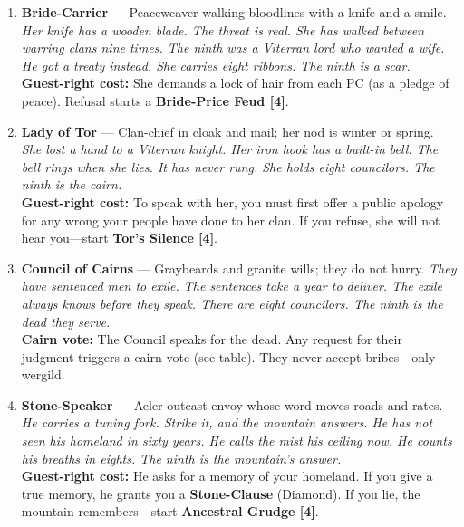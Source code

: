 \begin{enumerate}
\item[J] \textbf{Bride-Carrier} --- Peaceweaver walking bloodlines with a knife and a smile.
  \hfill \textit{Her knife has a wooden blade. The threat is real. She has walked between warring clans nine times. The ninth was a Viterran lord who wanted a wife. He got a treaty instead. She carries eight ribbons. The ninth is a scar.} \\
  \textbf{Guest-right cost:} She demands a lock of hair from each PC (as a pledge of peace). Refusal starts a \textbf{Bride-Price Feud [4]}.

\item[Q] \textbf{Lady of Tor} --- Clan-chief in cloak and mail; her nod is winter or spring.
  \hfill \textit{She lost a hand to a Viterran knight. Her iron hook has a built-in bell. The bell rings when she lies. It has never rung. She holds eight councilors. The ninth is the cairn.} \\
  \textbf{Guest-right cost:} To speak with her, you must first offer a public apology for any wrong your people have done to her clan. If you refuse, she will not hear you---start \textbf{Tor's Silence [4]}.

\item[K] \textbf{Council of Cairns} --- Graybeards and granite wills; they do not hurry.
  \hfill \textit{They have sentenced men to exile. The sentences take a year to deliver. The exile always knows before they speak. There are eight councilors. The ninth is the dead they serve.} \\
  \textbf{Cairn vote:} The Council speaks for the dead. Any request for their judgment triggers a cairn vote (see table). They never accept bribes---only wergild.

\item[A] \textbf{Stone-Speaker} --- Aeler outcast envoy whose word moves roads and rates.
  \hfill \textit{He carries a tuning fork. Strike it, and the mountain answers. He has not seen his homeland in sixty years. He calls the mist his ceiling now. He counts his breaths in eights. The ninth is the mountain's answer.} \\
  \textbf{Guest-right cost:} He asks for a memory of your homeland. If you give a true memory, he grants you a \textbf{Stone-Clause} (Diamond). If you lie, the mountain remembers---start \textbf{Ancestral Grudge [4]}.
\end{enumerate}

